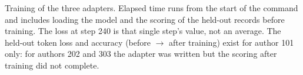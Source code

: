 \begin{table}[t]
\centering\small

\caption{Training of the three adapters. Elapsed time runs from the start of the command and
includes loading the model and the scoring of the held-out records before training. The loss at step
240 is that single step's value, not an average. The held-out token loss and accuracy (before
$\to$ after training) exist for author 101 only: for authors 202 and 303 the adapter was
written but the scoring after training did not complete.}
\label{tab:training}
\end{table}
